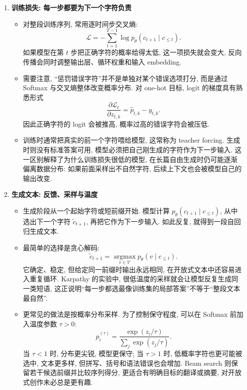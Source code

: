 \documentclass{../nndlcourse}
\begin{document}
\begin{enumerate}
\item \textbf{训练损失: 每一步都要为下一个字符负责}
  \begin{itemize}
    \item 对整段训练序列, 常用逐时间步交叉熵:
    \begin{equation*}
      \mathcal{L}
      = -\sum_{t=1}^{T-1}
      \log p_\theta(c_{t+1}\mid c_{\le t}).
    \end{equation*}
    如果模型在第 $t$ 步把正确字符的概率给得太低, 这一项损失就会变大, 反向传播会同时调整输出层、循环权重和输入 embedding.
    \item 需要注意, “惩罚错误字符”并不是单独对某个错误选项打分, 而是通过 Softmax 与交叉熵整体改变概率分布. 对 one-hot 目标, logit 的梯度具有熟悉形式
    \begin{equation*}
      \frac{\partial \mathcal{L}_t}{\partial z_{t,k}}
      = \hat{p}_{t,k} - y_{t,k}.
    \end{equation*}
    因此正确字符的 logit 会被推高, 概率过高的错误字符会被压低.
    \item 训练时通常把真实的前一个字符喂给模型, 这常称为 teacher forcing. 生成时则没有标准答案可用, 模型必须把自己刚生成的字符作为下一步输入. 这一区别解释了为什么训练损失很低的模型, 在长篇自由生成时仍可能逐渐偏离数据分布: 如果前面采样出不自然字符, 后续上下文也会被模型自己的输出改变.
  \end{itemize}

\item \textbf{生成文本: 反馈、采样与温度}
  \begin{itemize}
    \item 生成阶段从一个起始字符或短前缀开始. 模型计算 $p_\theta(c_{t+1}\mid c_{\le t})$, 从中选出下一个字符 $\tilde{c}_{t+1}$, 再把它作为下一步输入. 如此反复, 就得到一段自回归生成文本.
    \item 最简单的选择是贪心解码:
    \begin{equation*}
      \tilde{c}_{t+1} = \operatorname*{argmax}_{v\in\mathcal{V}}
      p_\theta(v\mid c_{\le t}).
    \end{equation*}
    它确定、稳定, 但给定同一前缀时输出永远相同, 在开放式文本中还容易进入重复循环. Karpathy 的实验中, 很低温度的采样就会让模型反复生成同一类短语, 这正说明“每一步都选最像训练集的局部答案”不等于“整段文本最自然”.
    \item 更常见的做法是按概率分布采样. 为了控制保守程度, 可以在 Softmax 前加入温度参数 $\tau>0$:
    \begin{equation*}
      p_i^{(\tau)}
      =
      \frac{\exp(z_i/\tau)}
           {\sum_j \exp(z_j/\tau)}.
    \end{equation*}
    当 $\tau<1$ 时, 分布更尖锐, 模型更保守; 当 $\tau>1$ 时, 低概率字符也更可能被选中, 文本更多样, 但拼写、括号和语法错误也会增加. Beam search 则保留若干候选前缀并比较序列得分, 更适合有明确目标的翻译或摘要, 对开放式创作未必总是更有趣.
  \end{itemize}


\end{enumerate}
\end{document}
